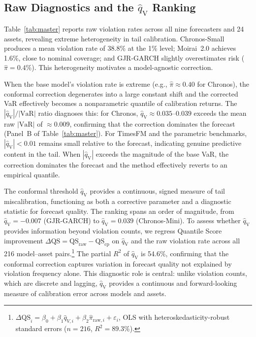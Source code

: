 \documentclass[preprint,11pt,authoryear]{elsarticle}
\newcommand{\VaR}{\mathrm{VaR}}
\newcommand{\1}{\boldsymbol{1}}
\newcommand{\qV}{\hat{q}_{\scriptscriptstyle\mathrm{V}}}
\begin{document}
	\subsection{Raw Diagnostics and the $\qV$ Ranking}
	\label{sec:results_raw}
	\label{sec:diagnostic}
	
	Table~\ref{tab:master} reports raw violation rates across all
	nine forecasters and 24 assets, revealing extreme heterogeneity
	in tail calibration. Chronos-Small produces a mean violation
	rate of 38.8\% at the 1\% level; Moirai~2.0 achieves 1.6\%,
	close to nominal coverage; and GJR-GARCH slightly overestimates
	risk ($\hat\pi = 0.4$\%). This heterogeneity motivates a
	model-agnostic correction.
	
	When the base model's violation rate is extreme (e.g.,
	$\hat\pi \approx 0.40$ for Chronos), the conformal correction
	degenerates into a large constant shift and the corrected VaR
	effectively becomes a nonparametric quantile of calibration
	returns. The $|\qV|/|\VaR|$ ratio diagnoses this: for
	Chronos, $\qV \approx 0.035$--$0.039$ exceeds the mean raw
	$|\VaR|$ of $\approx 0.009$, confirming that the correction
	dominates the forecast (Panel~B of
	Table~\ref{tab:master}). For TimesFM and the parametric
	benchmarks, $|\qV| < 0.01$ remains small relative to the
	forecast, indicating genuine predictive content in the tail.
	When $|\qV|$ exceeds the magnitude of the base VaR, the correction dominates the forecast and the method effectively reverts to an empirical quantile.

	The conformal threshold $\qV$ provides a continuous, signed
	measure of tail miscalibration, functioning as both a corrective parameter and a diagnostic statistic for forecast quality. The ranking spans an order of
	magnitude, from $\qV = -0.007$ (GJR-GARCH) to $\qV = 0.039$
	(Chronos-Mini). To assess whether $\qV$ provides information
	beyond violation counts, we regress Quantile Score improvement
	$\Delta\mathrm{QS} = \mathrm{QS}_{\mathrm{raw}} -
	\mathrm{QS}_{\mathrm{cp}}$ on $\qV$ and the raw violation
	rate across all 216 model--asset
	pairs.\footnote{$\Delta\mathrm{QS}_i = \beta_0 + \beta_1
		\hat{q}_{V,i} + \beta_2 \hat\pi_{\mathrm{raw},i} +
		\varepsilon_i$, OLS with heteroskedasticity-robust standard
		errors ($n = 216$, $R^2 = 89.3$\%).} The partial $R^2$ of
	$\qV$ is 54.6\%, confirming that the conformal correction
	captures variation in forecast quality not explained by
	violation frequency alone.
	This diagnostic role is central: unlike violation counts, which are discrete and lagging, $\qV$ provides a continuous and forward-looking measure of calibration error across models and assets.
\end{document}
